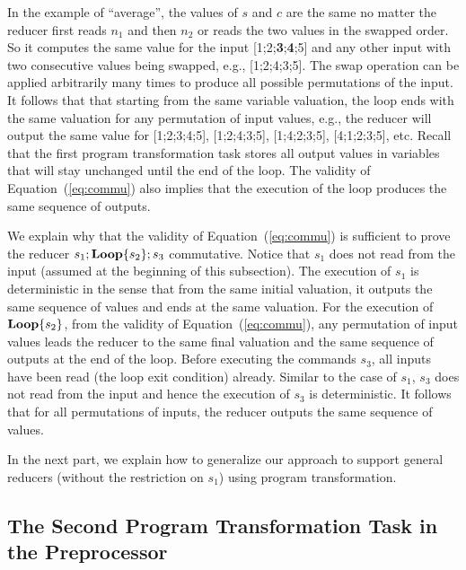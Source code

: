 \documentclass{llncs}
\newcommand{\rloop}{
	\ifmmode
	\mathbf{Loop}
	\else
	\textbf{Loop}
	\fi}
\begin{document}
In the example of ``average'', the values of $s$ and $c$ are the same no matter the reducer first reads $n_1$ and then $n_2$ or reads the two values in the swapped order.
So it computes the same value for the input [1;2;\textbf{3};\textbf{4};5] and any other input with two consecutive values being swapped, e.g., [1;2;4;3;5].
The swap operation can be applied arbitrarily many times to produce all possible permutations of the input.
It follows that that starting from the same variable valuation, the loop ends with the same valuation for any permutation of input values, e.g., the reducer will output the same value for [1;2;3;4;5], [1;2;4;3;5], [1;4;2;3;5], [4;1;2;3;5], etc.
Recall that the first program transformation task stores all output values in variables that will stay unchanged until the end of the loop. The validity of Equation~(\ref{eq:commu}) also implies that the execution of the loop produces the same sequence of outputs.

We explain why that the validity of Equation~(\ref{eq:commu}) is sufficient to prove the reducer $s_1;\rloop\{s_2\};s_3$ commutative. Notice that $s_1$ does not read from the input (assumed at the beginning of this subsection). The execution of $s_1$ is deterministic in the sense that from the same initial valuation, it outputs the same sequence of values and ends at the same valuation. For the execution of $\rloop\{s_2\}$, from the validity of Equation~(\ref{eq:commu}), any permutation of input values leads the reducer to the same final valuation and the same sequence of outputs at the end of the loop.
Before executing the commands $s_3$, all inputs have been read (the loop exit condition) already. Similar to the case of $s_1$, $s_3$ does not read from the input and hence the execution of $s_3$ is deterministic. It follows that for all permutations of inputs, the reducer outputs the same sequence of values.

In the next part, we explain how to generalize our approach to support general reducers (without the restriction on $s_1$) using program transformation.

\subsection{The Second Program Transformation Task in the Preprocessor}
\label{sec:program_trans2}
\end{document}
